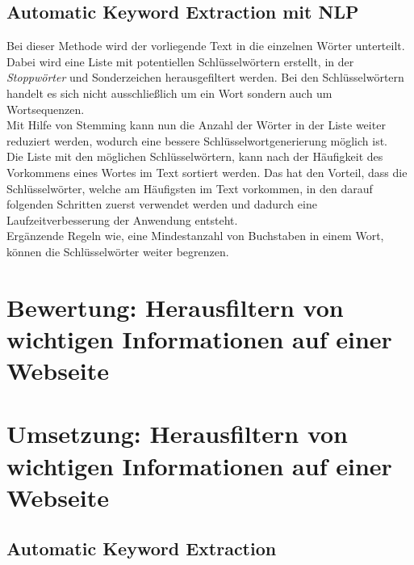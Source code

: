 	\subsection{Automatic Keyword Extraction mit NLP}
	\label{sec:Automatic Keyword Extraction}
	Bei dieser Methode wird der vorliegende Text in die einzelnen Wörter unterteilt. Dabei wird eine Liste mit potentiellen Schlüsselwörtern erstellt, in der \textit{Stoppwörter} und Sonderzeichen herausgefiltert werden. Bei den Schlüsselwörtern handelt es sich nicht ausschließlich um ein Wort sondern auch um Wortsequenzen.\\
	Mit Hilfe von Stemming kann nun die Anzahl der Wörter in der Liste weiter reduziert werden, wodurch eine bessere Schlüsselwortgenerierung möglich ist. \\
	Die Liste mit den möglichen Schlüsselwörtern, kann nach der Häufigkeit des Vorkommens eines Wortes im Text sortiert werden. Das hat den Vorteil, dass die Schlüsselwörter, welche am Häufigsten im Text vorkommen, in den darauf folgenden Schritten zuerst verwendet werden und dadurch eine Laufzeitverbesserung der Anwendung entsteht.\\
	Ergänzende Regeln wie, eine Mindestanzahl von Buchstaben in einem Wort, können die Schlüsselwörter weiter begrenzen. 
	
\section{Bewertung: Herausfiltern von wichtigen Informationen auf einer Webseite}
	
\section{Umsetzung: Herausfiltern von wichtigen Informationen auf einer Webseite}
	\subsection{Automatic Keyword Extraction}%
